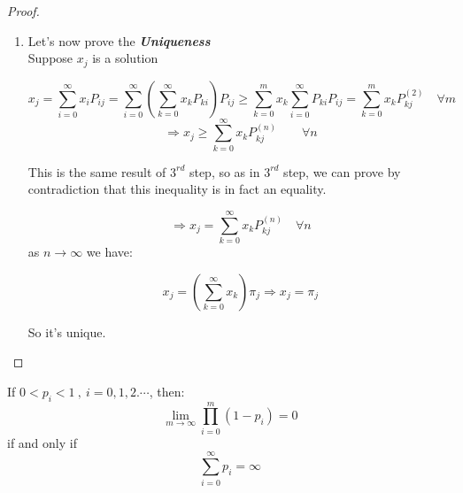 \begin{proof}
\begin{enumerate}
			\item
			Let's now prove the \textbf{\textit{Uniqueness}} \\
			Suppose $x_j$ is a solution

			$$x_j =
			 \sum_{i=0}^\infty x_i P_{ij} =
			 \sum_{i=0}^\infty ( \sum_{k=0}^\infty x_k P_{ki} ) P_{ij} \geq
			 \sum_{k=0}^m x_k \sum_{i=0}^\infty P_{ki} P_{ij} =
			 \sum_{k=0}^m x_k P_{kj}^{(2)}
			 \quad \forall m$$
			$$ \Rightarrow x_j \geq \sum_{k=0}^\infty x_k P_{kj}^{(n)}\qquad \forall n $$

			This is the same result of $3^{rd}$ step, so as in $3^{rd}$ step, we can prove by contradiction that this inequality is in fact an equality.

			$$\Rightarrow x_j = \sum_{k=0}^\infty x_k P_{kj}^{(n)} \quad \forall n$$
			as $n \to \infty$ we have:

			\begin{equation}
				x_j = (\sum_{k=0}^\infty x_k ) \pi_j \Rightarrow x_j = \pi_j
			\end{equation}

			So it's unique.
		\end{enumerate}
	\end{proof}

	\begin{lemma}
	  If $0 < p_i < 1 ~,~ i=0,1,2.\cdots $, then:
		\begin{equation}\label{limprodpi}
			\lim_{m \to \infty} \prod_{i=0}^{m}(1-p_i) = 0
		\end{equation}
		if and only if
		\begin{equation}\label{pitoinfty}
			\sum_{i=0}^\infty p_i = \infty
		\end{equation}
	\end{lemma}

